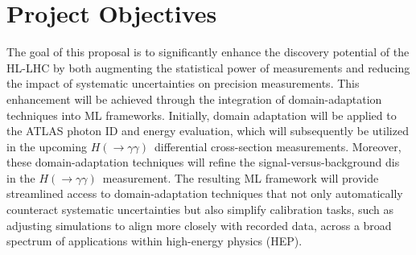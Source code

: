 \documentclass[letter, USenglish, 11pt, subfigure]{article}
\newcommand{\hyy}{\ensuremath{H(\to\gamma\gamma)}}
\begin{document}
\section{Project Objectives}

The goal of this proposal is to significantly enhance the discovery potential of the HL-LHC by both augmenting the statistical power of measurements and reducing the impact of systematic uncertainties on precision measurements. This enhancement will be achieved through the integration of domain-adaptation techniques into ML frameworks. Initially, domain adaptation will be applied to the ATLAS photon ID and energy evaluation, which will subsequently be utilized in the upcoming \hyy\ differential cross-section measurements. Moreover, these domain-adaptation techniques will refine the signal-versus-background dis in the \hyy\ measurement. The resulting ML framework will provide streamlined access to domain-adaptation techniques that not only automatically counteract systematic uncertainties but also simplify calibration tasks, such as adjusting simulations to align more closely with recorded data, across a broad spectrum of applications within high-energy physics (HEP).
\end{document}
